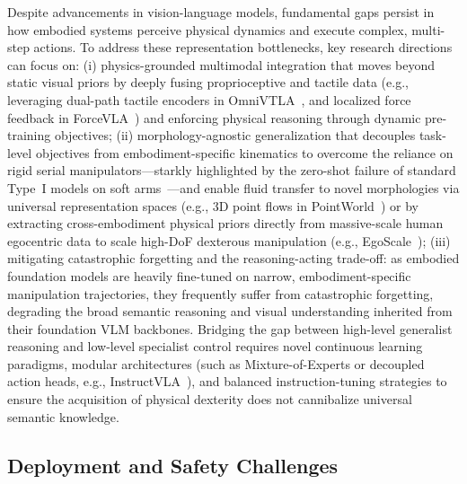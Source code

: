 \documentclass[acmsmall,screen,review,anonymous]{acmart}
\begin{document}
Despite advancements in vision-language models, fundamental gaps persist in how embodied systems perceive physical dynamics and execute complex, multi-step actions. To address these representation bottlenecks, 
key research directions can focus on: (i) physics-grounded multimodal integration that moves beyond static visual priors by deeply fusing proprioceptive and tactile data (e.g., leveraging dual-path tactile encoders in OmniVTLA~\cite{cheng2025omnivtla}, and localized force feedback in ForceVLA~\cite{yu2025forcevla}) and enforcing physical reasoning through dynamic pre-training objectives; 
(ii) morphology-agnostic generalization that decouples task-level objectives from embodiment-specific kinematics to overcome the reliance on rigid serial manipulators---starkly highlighted by the zero-shot failure of standard Type~I models on soft arms~\cite{su2025bridgingembodiment}---and enable fluid transfer to novel morphologies via universal representation spaces (e.g., 3D point flows in PointWorld~\cite{huang2026pointworld}) or by extracting cross-embodiment physical priors directly from massive-scale human egocentric data to scale high-DoF dexterous manipulation (e.g., EgoScale~\cite{zheng2026egoscale});
(iii) mitigating catastrophic forgetting and the reasoning-acting trade-off: as embodied foundation models are heavily fine-tuned on narrow, embodiment-specific manipulation trajectories, they frequently suffer from catastrophic forgetting, degrading the broad semantic reasoning and visual understanding inherited from their foundation VLM backbones. Bridging the gap between high-level generalist reasoning and low-level specialist control requires novel continuous learning paradigms, modular architectures (such as Mixture-of-Experts or decoupled action heads, e.g., InstructVLA~\cite{yang2025instructvla}), and balanced instruction-tuning strategies to ensure the acquisition of physical dexterity does not cannibalize universal semantic knowledge.

\subsection{Deployment and Safety Challenges}\label{sec:deployment_safety}
\end{document}
